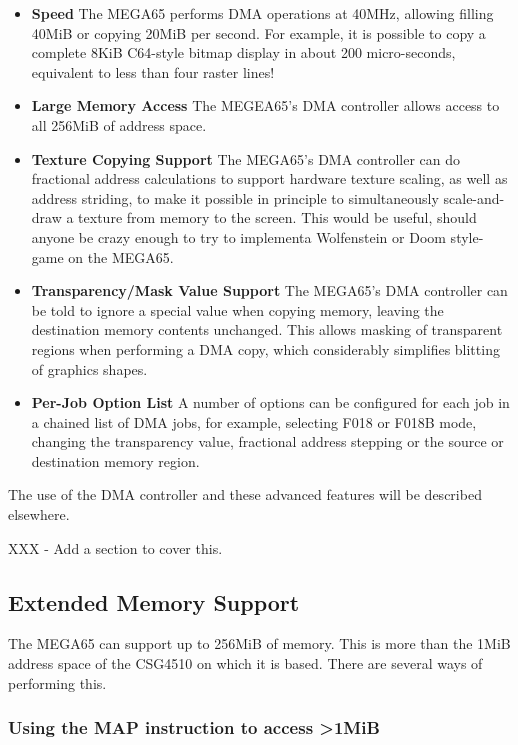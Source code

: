 \begin{itemize}
\item{\bf Speed} The MEGA65 performs DMA operations at 40MHz, allowing filling 40MiB or copying 20MiB
  per second.  For example, it is possible to copy a complete 8KiB C64-style bitmap display in
  about 200 micro-seconds, equivalent to less than four raster lines!
\item{\bf Large Memory Access} The MEGEA65's DMA controller allows access to all 256MiB of address space.
\item{\bf Texture Copying Support} The MEGA65's DMA controller can do fractional address calculations
  to support hardware texture scaling, as well as address striding, to make it possible in principle
  to simultaneously scale-and-draw a texture from memory to the screen. This would be useful, should
  anyone be crazy enough to try to implementa Wolfenstein or Doom style-game on the MEGA65.
\item{\bf Transparency/Mask Value Support} The MEGA65's DMA controller can be told to ignore a special value
  when copying memory, leaving the destination memory contents unchanged. This allows masking of transparent
  regions when performing a DMA copy, which considerably simplifies blitting of graphics shapes.
\item{\bf Per-Job Option List} A number of options can be configured for each job in a chained list of DMA
  jobs, for example, selecting F018 or F018B mode, changing the transparency value, fractional address stepping
  or the source or destination memory region.
\end{itemize}

The use of the DMA controller and these advanced features will be described elsewhere.

XXX - Add a section to cover this.

\subsection{Extended Memory Support}

The MEGA65 can support up to 256MiB of memory. This is more than the 1MiB address space of the CSG4510
on which it is based. There are several ways of performing this.

\subsubsection{Using the MAP instruction to access >1MiB}

